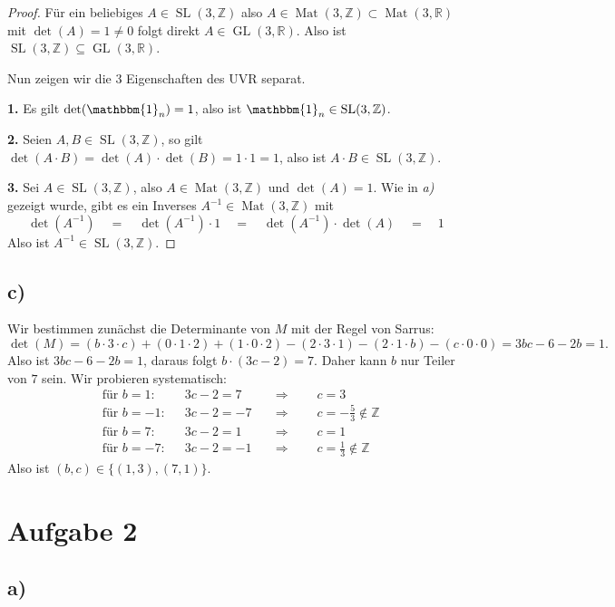 \documentclass{article}
\newcommand{\ZZ}{\mathbb{Z}}
\newcommand{\RR}{\mathbb{R}}
\newcommand{\imp}{\mathbb{\Rightarrow}}
\newcommand{\eq}{\mathbb{\quad = \quad}}
\DeclareMathOperator{\Mat}{Mat}
\DeclareMathOperator{\GL}{GL}
\DeclareMathOperator{\SL}{SL}
\begin{document}
\begin{proof}
Für ein beliebiges $A \in \SL(3,\ZZ)$ also $A \in \Mat(3,\ZZ) \subset \Mat(3,\RR)$
mit $\det(A) = 1 \neq 0$ folgt direkt $A \in \GL(3,\RR)$.
Also ist $\SL(3,\ZZ) \subseteq \GL(3,\RR)$.

Nun zeigen wir die 3 Eigenschaften des UVR separat.

\bigbreak
\textbf{1.}
Es gilt
$\det(\mathbbm{1}_n) = 1$,
also ist
$\mathbbm{1}_n \in \SL(3,\ZZ)$.

\bigbreak
\textbf{2.}
Seien
$A,B \in \SL(3,\ZZ)$,
so gilt
$\det(A \cdot B) = \det(A) \cdot \det(B) = 1 \cdot 1 = 1$,
also ist
$A \cdot B \in \SL(3,\ZZ)$.

\bigbreak
\textbf{3.}
Sei
$A \in \SL(3,\ZZ)$,
also
$A \in \Mat(3,\ZZ)$ und $\det(A) = 1$.
Wie in \textit{a)} gezeigt wurde, gibt es ein
Inverses $A^{-1} \in \Mat(3,\ZZ)$ mit
\[
  \det(A^{-1}) \eq \det(A^{-1}) \cdot 1 \eq
  \det(A^{-1}) \cdot \det(A) \eq 1
\]
Also ist $A^{-1} \in \SL(3,\ZZ)$.
\end{proof}
\newpage

\subsection*{c)}
Wir bestimmen zunächst die Determinante von $M$
mit der Regel von Sarrus:
\[
  \det(M) = (b \cdot 3 \cdot c) + (0 \cdot 1 \cdot 2)
  + (1 \cdot 0 \cdot 2) - (2 \cdot 3 \cdot 1) - (2 \cdot 1
  \cdot b) - (c \cdot 0 \cdot 0)
  = 3bc - 6 - 2b = 1.
\]
Also ist
$
  3bc - 6 - 2b = 1$,
  daraus folgt
  $b \cdot (3c-2) = 7.
$
Daher kann $b$ nur Teiler von $7$ sein.
Wir probieren systematisch:
\begin{align*}
  &\text{für $b = 1$:}   && 3c-2 = 7 &&\imp\qquad c = 3 \\
  &\text{für $b = -1$:}   && 3c-2 = -7 &&\imp\qquad c = -\frac{5}{3} \notin \ZZ \\
  &\text{für $b = 7$:}   && 3c-2 = 1 &&\imp\qquad c = 1 \\
  &\text{für $b = -7$:}   && 3c-2 = -1 &&\imp\qquad c = \frac{1}{3} \notin \ZZ
\end{align*}
Also ist $(b,c) \in \{(1,3),(7,1)\}$.



\newpage

\section*{Aufgabe 2}

\subsection*{a)}
\end{document}
